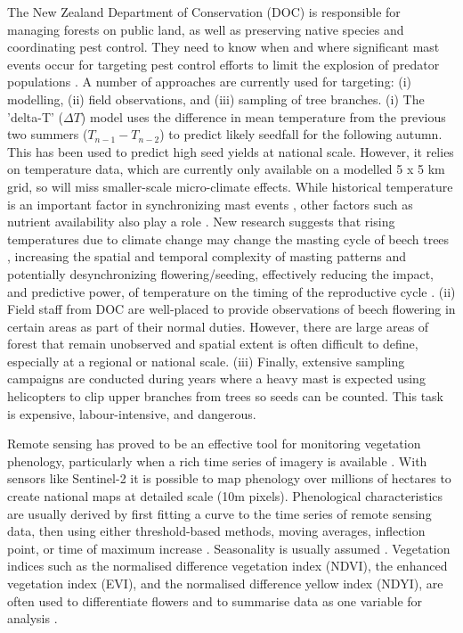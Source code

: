 \documentclass[remotesensing,article,submit,moreauthors,pdftex]{Definitions/mdpi}
\begin{document}
The New Zealand Department of Conservation (DOC) is responsible for managing forests on public land, as well as preserving native
species and coordinating pest control. They need to know when and where significant mast events occur for targeting pest
control efforts to limit the explosion of predator populations \citep{Elliott2016}. A number of approaches are currently
used for targeting: (i) modelling, (ii) field observations, and (iii) sampling of tree branches. (i) The 'delta-T' ($\Delta{T}$) model
\citep{Kelly2013} uses the difference in mean temperature from the previous two summers ($T_{n-1} - T_{n-2}$) to predict
likely seedfall for the following autumn. This has been used to predict high seed yields at national scale.
However, it relies on temperature data, which are currently only available on a modelled 5 x 5 km grid, so will miss
smaller-scale micro-climate effects. While historical temperature is an important factor in synchronizing mast events \citep{Kelly2013}, other factors such as nutrient availability also play a role \citep{Allen2014}. New research suggests that rising temperatures due to climate change may change the masting cycle of beech trees \citep{Bogdziewicz2020,Allen2014}, increasing the spatial and temporal complexity of masting patterns \citep{Allen2014} and potentially desynchronizing flowering/seeding, effectively reducing the impact, and predictive power, of temperature on the timing of the reproductive cycle \citep{Bogdziewicz2021}. (ii) Field staff from DOC are well-placed to provide observations of beech flowering in
certain areas as part of their normal duties. However, there are large areas of forest that remain unobserved and
spatial extent is often difficult to define, especially at a regional or national scale. (iii) Finally, extensive sampling
campaigns are conducted during years where a heavy mast is expected using helicopters to clip upper branches from trees
so seeds can be counted. This task is expensive, labour-intensive, and dangerous. 

Remote sensing has proved to be an effective tool for monitoring vegetation phenology, particularly when a rich time series of imagery is available \citep{Zeng2020}. With sensors like Sentinel-2 it is possible to map phenology over millions of hectares to create national maps at detailed scale (10m pixels). Phenological characteristics are usually derived by first fitting a curve to the time series of remote sensing data, then using either threshold-based methods, moving averages, inflection point, or time of maximum increase \citep{Noumonvi2021}. Seasonality is usually assumed \citep{Noumonvi2021}. Vegetation indices such as the normalised difference vegetation index (NDVI), the enhanced vegetation index (EVI), and the normalised difference yellow index (NDYI), are often used to differentiate flowers and to summarise data as one variable for analysis \citep{Dixon2021,Noumonvi2021}.
\end{document}
